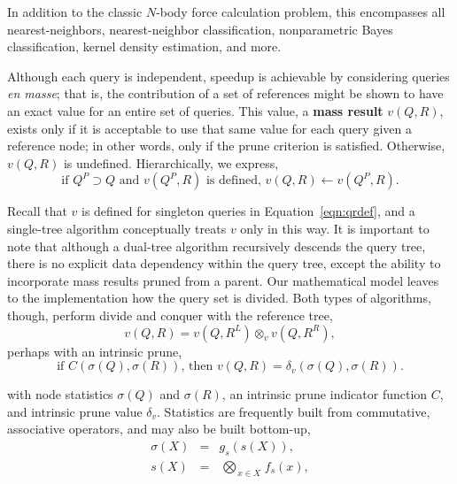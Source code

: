 \documentclass[twoside,leqno,twocolumn]{article}
\newcommand{\summary}{\delta}
\newcommand{\defterm}[1]{{\bf #1}}
\newcommand{\kdleft}[1]{#1^{\!L}}
\newcommand{\kdright}[1]{#1^{\!R}}
\newcommand{\kdparent}[1]{#1^{\!P}}
\newcommand{\nameOp}[2]{\mathop{#1\nolimits\!\!_{#2}}}
\newcommand{\nameop}[2]{#1_{\!#2}}
\newcommand{\myOp}[1]{\nameOp{\bigotimes}{#1}}
\newcommand{\myop}[1]{\nameop{\otimes}{#1}}
\newcommand{\letterqr}{v}
\newcommand{\opqr}{\myop{\letterqr}}
\newcommand{\letterqrv}{v}
\newcommand{\inqrv}{v}
\newcommand{\deltaqrv}{\summary_{\letterqrv}}
\newcommand{\canpruneqrv}{C}%
\newcommand{\letterstat}{s}
\newcommand{\outstat}{\sigma}
\newcommand{\instat}{s}
\newcommand{\Opstat}{\myOp{\letterstat}}
\newcommand{\fstat}{f_{\letterstat}}
\newcommand{\gstat}{g_{\letterstat}}
\begin{document}
\noindent
In addition to the classic $N$-body force calculation problem, this encompasses all nearest-neighbors, nearest-neighbor classification, nonparametric Bayes classification, kernel density estimation, and more.

Although each query is independent, speedup is achievable by considering queries {\it en masse}; that is, the contribution of a set of references might be shown to have an exact value for an entire set of queries.
This value, a \defterm{mass result} $\inqrv(Q, R)$, exists only if it is acceptable to use that same value for each query given a reference node; in other words, only if the prune criterion is satisfied.
Otherwise, $\inqrv(Q,R)$ is undefined.
Hierarchically, we express,
\begin{equation}
\text{if } \kdparent{Q} \supset Q \text{ and }\inqrv(\kdparent{Q}, R)\text{ is defined, } \inqrv(Q, R) \gets \inqrv(\kdparent{Q}, R).
\label{eqn:qrvparent}
\end{equation}

\noindent
Recall that $\inqrv$ is defined for singleton queries in Equation~\ref{eqn:qrdef}, and a single-tree algorithm conceptually treats $\inqrv$ only in this way.
It is important to note that although a dual-tree algorithm recursively descends the query tree, there is no explicit data dependency within the query tree, except the ability to incorporate mass results pruned from a parent.
Our mathematical model leaves to the implementation how the query set is divided.
Both types of algorithms, though, perform divide and conquer with the reference tree,
\begin{equation}
\inqrv(Q, R) = \inqrv(Q, \kdleft{R}) \opqr \inqrv(Q, \kdright{R}),
\label{eqn:qrvcompose}
\end{equation}
\noindent perhaps with an intrinsic prune,
\begin{equation}
\text{if } \canpruneqrv(\outstat(Q), \outstat(R)) \text{, then } \inqrv(Q, R) = \deltaqrv(\outstat(Q), \outstat(R)).
\label{eqn:qrvprune}
\end{equation}

\noindent
with node statistics $\outstat(Q)$ and $\outstat(R)$, an intrinsic prune indicator function $\canpruneqrv$, and intrinsic prune value $\deltaqrv$.
Statistics are frequently built from commutative, associative operators, and may also be built bottom-up,
\begin{eqnarray}
\outstat(X) &=& \gstat(\instat(X)),
\\
\instat(X) &=& \Opstat_{x \in X} \fstat(x),
\label{eqn:defstat}
\end{eqnarray}
\end{document}
